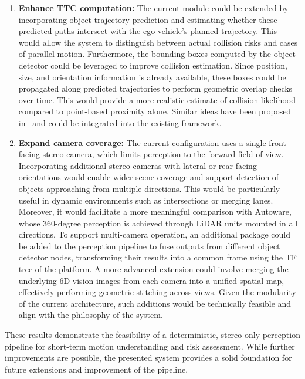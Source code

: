 \begin{enumerate}
  \item \textbf{Enhance TTC computation:} The current module could be extended 
      by incorporating object trajectory prediction and estimating whether 
      these predicted paths intersect with the ego-vehicle's planned 
      trajectory. This would allow the system to distinguish between 
      actual collision risks and cases of parallel motion. Furthermore, 
      the bounding boxes computed by the object detector could be leveraged 
      to improve collision estimation. Since position, size, and orientation 
      information is already available, these boxes could be propagated 
      along predicted trajectories to perform geometric overlap checks 
      over time. This would provide a more realistic estimate of collision 
      likelihood compared to point-based proximity alone. Similar ideas 
      have been proposed in~\cite{improved_ttc} and could be integrated 
      into the existing framework.

  \item \textbf{Expand camera coverage:} The current configuration uses a single 
      front-facing stereo camera, which limits perception to the forward 
      field of view. Incorporating additional stereo cameras with lateral 
      or rear-facing orientations would enable wider scene coverage and 
      support detection of objects approaching from multiple directions. 
      This would be particularly useful in dynamic environments such as 
      intersections or merging lanes. Moreover, it would facilitate a more 
      meaningful comparison with Autoware, whose 360-degree perception is 
      achieved through LiDAR units mounted in all directions. To support 
      multi-camera operation, an additional package could be added to the 
      perception pipeline to fuse outputs from different object detector 
      nodes, transforming their results into a common frame using the TF 
      tree of the platform. A more advanced extension could involve merging the underlying 
      6D vision images from each camera into a unified spatial map, 
      effectively performing geometric stitching across views. Given the 
      modularity of the current architecture, such additions would be 
      technically feasible and align with the philosophy of the system.


\end{enumerate}


These results demonstrate the feasibility of a deterministic, stereo-only 
perception pipeline for short-term motion understanding and risk assessment. 
While further improvements are possible, the presented system provides a solid 
foundation for future extensions and improvement of the pipeline.
